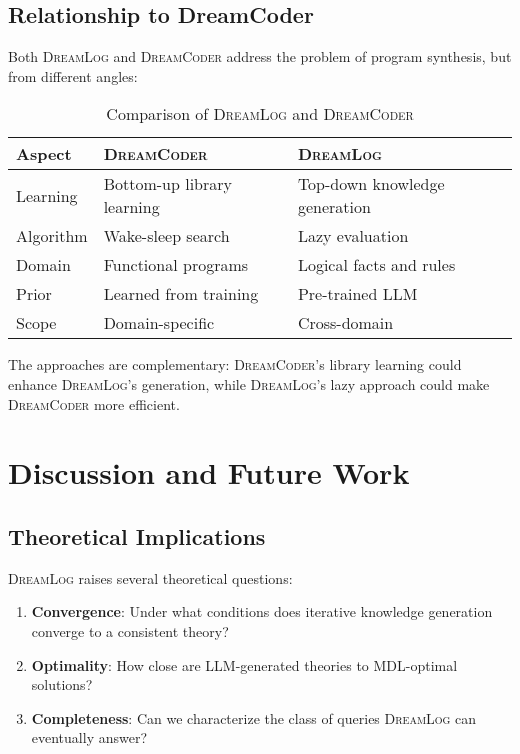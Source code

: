 \documentclass[11pt,a4paper]{article}
\newcommand{\dreamlog}{\textsc{DreamLog}}
\newcommand{\dreamcoder}{\textsc{DreamCoder}}
\begin{document}
\subsection{Relationship to DreamCoder}

Both \dreamlog{} and \dreamcoder{} address the problem of program synthesis, but from different angles:

\begin{table}[h]
\centering
\caption{Comparison of \dreamlog{} and \dreamcoder{}}
\label{tab:dreamcoder}
\begin{tabular}{lll}
\toprule
Aspect & \dreamcoder{} & \dreamlog{} \\
\midrule
Learning & Bottom-up library learning & Top-down knowledge generation \\
Algorithm & Wake-sleep search & Lazy evaluation \\
Domain & Functional programs & Logical facts and rules \\
Prior & Learned from training & Pre-trained LLM \\
Scope & Domain-specific & Cross-domain \\
\bottomrule
\end{tabular}
\end{table}

The approaches are complementary: \dreamcoder{}'s library learning could enhance \dreamlog{}'s generation, while \dreamlog{}'s lazy approach could make \dreamcoder{} more efficient.

\section{Discussion and Future Work}

\subsection{Theoretical Implications}

\dreamlog{} raises several theoretical questions:

\begin{enumerate}
\item \textbf{Convergence}: Under what conditions does iterative knowledge generation converge to a consistent theory?
\item \textbf{Optimality}: How close are LLM-generated theories to MDL-optimal solutions?
\item \textbf{Completeness}: Can we characterize the class of queries \dreamlog{} can eventually answer?
\end{enumerate}
\end{document}
